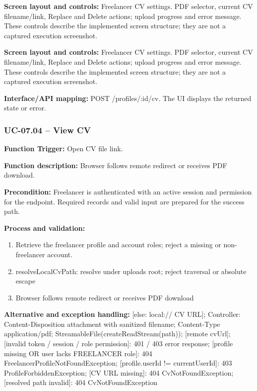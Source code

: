 \textbf{Screen layout and controls:} Freelancer CV settings. PDF selector, current CV filename/\allowbreak{}link, Replace and Delete actions; upload progress and error message. These controls describe the implemented screen structure; they are not a captured execution screenshot.

\textbf{Screen layout and controls:} Freelancer CV settings. PDF selector, current CV filename/\allowbreak{}link, Replace and Delete actions; upload progress and error message. These controls describe the implemented screen structure; they are not a captured execution screenshot.

\textbf{Interface/\allowbreak{}API mapping:} POST /\allowbreak{}profiles/\allowbreak{}:id/\allowbreak{}cv. The UI displays the returned state or error.

\subsubsection{UC-07.04 -- View CV}
\textbf{Function Trigger:} Open CV file link.

\textbf{Function description:} Browser follows remote redirect or receives PDF download.

\textbf{Precondition:} Freelancer is authenticated with an active session and permission for the endpoint. Required records and valid input are prepared for the success path.

\textbf{Process and validation:}
\begin{enumerate}
\item Retrieve the freelancer profile and account roles; reject a missing or non-freelancer account.
\item resolve\allowbreak{}Local\allowbreak{}Cv\allowbreak{}Path: resolve under uploads root; reject traversal or absolute escape
\item Browser follows remote redirect or receives PDF download
\end{enumerate}
\textbf{Alternative and exception handling:} [else: local:/\allowbreak{}/\allowbreak{} CV URL]; Controller: Content-Disposition attachment with sanitized filename; Content-Type application/\allowbreak{}pdf; Streamable\allowbreak{}File(create\allowbreak{}Read\allowbreak{}Stream(path)); [remote cv\allowbreak{}Url]; [invalid token /\allowbreak{} session /\allowbreak{} role permission]: 401 /\allowbreak{} 403 error response; [profile missing OR user lacks FREELANCER role]: 404 Freelancer\allowbreak{}Profile\allowbreak{}Not\allowbreak{}Found\allowbreak{}Exception; [profile.user\allowbreak{}Id !=\allowbreak{} current\allowbreak{}User\allowbreak{}Id]: 403 Profile\allowbreak{}Forbidden\allowbreak{}Exception; [CV URL missing]: 404 Cv\allowbreak{}Not\allowbreak{}Found\allowbreak{}Exception; [resolved path invalid]: 404 Cv\allowbreak{}Not\allowbreak{}Found\allowbreak{}Exception

